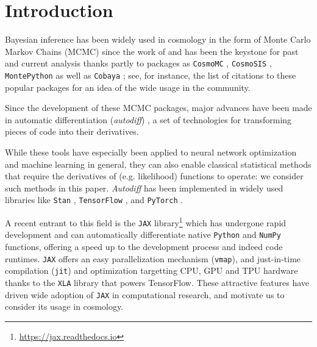 \documentclass[twocolumn,twocolappendix,nofootinbib,iop]{openjournal}
\begin{document}
\maketitle




\section{Introduction}
Bayesian inference has been widely used in cosmology in the form of Monte Carlo Markov Chains (MCMC) since the work of \citep{2001ApJ...563L..95K,2003MNRAS.341.1084R} and has been the keystone for past and current analysis thanks partly to packages as  \texttt{CosmoMC} \citep{2002PhRvD..66j3511L}, \texttt{CosmoSIS} \citep{2015A&C....12...45Z}, \texttt{MontePython} \citep{2019PDU....24..260B} as well as   \texttt{Cobaya} \citep{2019ascl.soft10019T,2021JCAP...05..057T}; see, for instance, the list of citations to these popular packages for an idea of the wide usage in the community. 


Since the development of these MCMC packages, major advances have been made in automatic differentiation (\textit{autodiff}) \citep{10.5555/3122009.3242010, Margossian2019}, a set of technologies for transforming pieces of code into their derivatives.

While these tools have especially been applied to neural network optimization and machine learning in general, they can also enable classical statistical methods that require the derivatives of (e.g. likelihood) functions to operate: we consider such methods in this paper. \textit{Autodiff} has been implemented in widely used libraries like \texttt{Stan} \citep{JSSv076i01}, \texttt{TensorFlow}  \citep{tensorflow2015-whitepaper}, and  \texttt{PyTorch} \citep{NEURIPS2019_9015}. 

A recent entrant to this field is the \texttt{JAX} library\footnote{\url{https://jax.readthedocs.io}} \citep{jax2018github} which has undergone rapid development and can automatically differentiate native \texttt{Python} and \texttt{NumPy} functions, offering a speed up to the development process and indeed code runtimes. \texttt{JAX} offers an easy parallelization mechanism (\texttt{vmap}), and just-in-time compilation (\texttt{jit}) and optimization targetting CPU, GPU and TPU hardware thanks to the \texttt{XLA} library that powers TensorFlow. These attractive features have driven wide adoption of \texttt{JAX} in computational research, and motivate us to consider its usage in cosmology.
\end{document}
